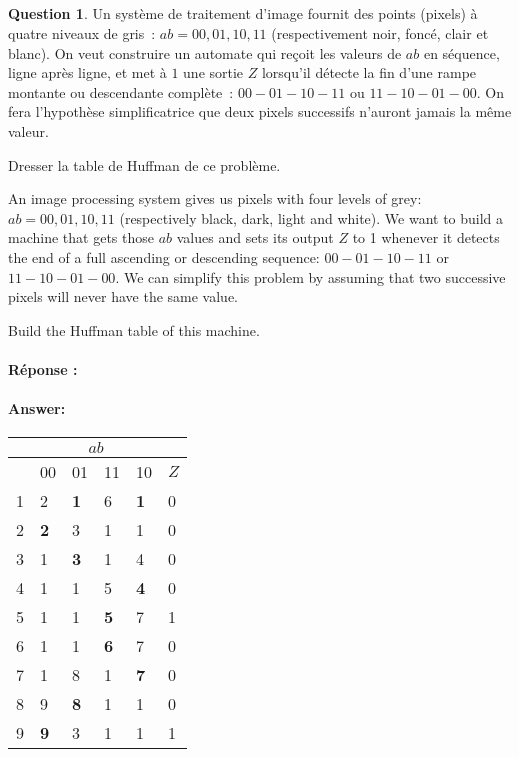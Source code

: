 \documentclass[11pt,a4paper,dvipsnames]{article}
\date{\vspace{-1.7cm}\version}
\title{\vspace{-2cm} \tpnumber\\ \fr{Électronique numérique [ELEC-H-310] \ifthenelse{\boolean{corrige}}{~\\Corrigé}{}}%
\en{Digital Electronics [ELEC-H-310] \ifthenelse{\boolean{corrige}}{~\\Correction}{}}%
}
\theoremstyle{definition}%
\newtheorem{Q}{Question}[] %
\newcommand{\reponse}[1]{%
	\ifthenelse {\boolean{corrige}} {\fr{\paragraph{Réponse :}}\en{\paragraph{Answer:}} \color{darkblue}   #1\color{black}} {}
 }
\newcommand{\fr}[1]{
 	\ifthenelse {\boolean{fr}} {#1} {}
 }
\newcommand{\en}[1]{
 	\ifthenelse {\boolean{en}} {#1} {}
 }
\begin{document}
\maketitle
\vspace*{1cm}

\begin{Q}
\fr{Un système de traitement d'image fournit des points (pixels) à quatre niveaux de gris~: $ab = 00, 01, 10, 11$ (respectivement noir, foncé, clair et blanc).
On veut construire un automate qui reçoit les valeurs de $ab$ en séquence, ligne après ligne, et met à $1$ une sortie $Z$ lorsqu'il détecte la fin d'une rampe montante ou descendante complète~: $00-01-10-11$ ou $11-10-01-00$.
On fera l'hypothèse simplificatrice que deux pixels successifs n'auront jamais la même valeur.

Dresser la table de Huffman de ce problème.}

\en{An image processing system gives us pixels with four levels of grey: $ab = 00, 01, 10, 11$ (respectively black, dark, light and white).
We want to build a machine that gets those $ab$ values and sets its output $Z$ to 1 whenever it detects the end of a full ascending or descending sequence: $00-01-10-11$ or $11-10-01-00$.
We can simplify this problem by assuming that two successive pixels will never have the same value.

Build the Huffman table of this machine.}

\reponse{
	\begin{center}
		\begin{tabular}{|l|l|l|l|l|l|} \hline
			& \multicolumn{4}{c}{$ab$} & \\ \hline
			& 00 & 01 & 11 & 10 & $Z$ \\ \hline
			1 & 2 & \textbf{1} & 6 & \textbf{1} & 0 \\ \hline
			2 & \textbf{2} & 3 & 1 & 1 & 0 \\ \hline
			3 & 1 & \textbf{3} & 1 & 4 & 0 \\ \hline
			4 & 1 & 1 & 5 & \textbf{4} & 0 \\ \hline
			5 & 1 & 1 & \textbf{5} & 7 & 1 \\ \hline
			6 & 1 & 1 & \textbf{6} & 7 & 0 \\ \hline
			7 & 1 & 8 & 1 & \textbf{7} & 0 \\ \hline
			8 & 9 & \textbf{8} & 1 & 1 & 0 \\ \hline
			9 & \textbf{9} & 3 & 1 & 1 & 1 \\ \hline
		\end{tabular}
	\end{center}
}
\end{Q}
\end{document}
